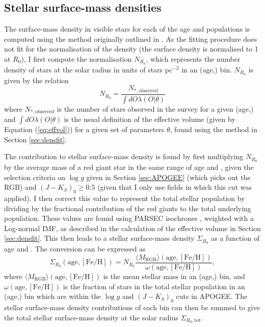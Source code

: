 \subsection{Stellar surface-mass densities}
 \label{sec:surfmasscalc}
The surface-mass density in visible stars for each of the age and \feh{} populations is computed using the method originally outlined in \citet{2012ApJ...751..131B}. As the fitting procedure does not fit for the normalisation of the density (the surface density is normalised to 1 at $R_0$), I first compute the normalisation $N_{R_0}$, which represents the number density of stars at the solar radius in units of stars pc$^{-2}$ in an (age,\feh{}) bin. $N_{R_0}$ is given by the relation 
\begin{equation}
 N_{R_0} = \frac{N_{*,\text{observed}}}{\int dO \lambda(O|\theta)}
\end{equation}
where $N_{*,\text{observed}}$ is the number of stars observed in the survey for a given (age,\feh{}) and $\int dO \lambda(O|\theta)$ is the usual definition of the effective volume (given by Equation (\ref{eq:effvol})) for a given set of parameters $\theta$, found using the method in Section \ref{sec:densfit}. 

The contribution to stellar surface-mass density is found by first multiplying $N_{R_0}$ by the average mass of a red giant star in the same range of age and \feh{}, given the selection criteria on $\log{g}$ given in Section \ref{sec:APOGEE} (which picks out the RGB) and  $(J-K_S)_0 \geq 0.5$ (given that I only use fields in which this cut was applied).  I then correct this value to represent the total stellar population by dividing by the fractional contribution of the red giants to the total underlying population. These values are found using PARSEC isochrones \citep{2012MNRAS.427..127B}, weighted with a Log-normal \citet{2001ApJ...554.1274C} IMF, as described in the calculation of the effective volume in Section \ref{sec:densfit}. This then leads to a stellar surface-mass density $\Sigma_{R_0}$ as a function of age and \feh{}. The conversion can be expressed as
\begin{equation}
 \Sigma_{R_0}(\mathrm{age,[Fe/H]}) = N_{R_0} \frac{\langle M_{\text{RGB}} \rangle (\mathrm{age,[Fe/H]})}{\omega(\mathrm{age,[Fe/H]})},
\end{equation}
where $\langle M_{\text{RGB}} \rangle (\mathrm{age,[Fe/H]})$ is the mean stellar mass in an (age,\feh{}) bin, and $\omega(\mathrm{age,[Fe/H]})$ is the fraction of stars in the total stellar population in an (age,\feh{}) bin which are within the $\log{g}$ and $(J-K_S)_0$ cuts in APOGEE. The stellar surface-mass density contributions of each bin can then be summed to give the total stellar surface-mass density at the solar radius $\Sigma_{R_0, \text{tot}}$.

